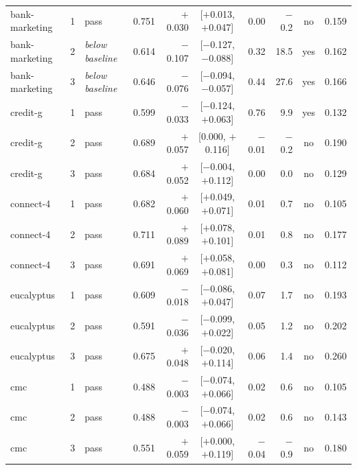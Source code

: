 {\begin{longtable}{lcl rrc rrcr}
\midrule
bank-marketing & 1 & pass & 0.751 & $+$0.030 & [$+$0.013, $+$0.047] & 0.00 & $-$0.2 & no & 0.159 \\
bank-marketing & 2 & \emph{below baseline} & 0.614 & $-$0.107 & [$-$0.127, $-$0.088] & 0.32 & 18.5 & yes & 0.162 \\
bank-marketing & 3 & \emph{below baseline} & 0.646 & $-$0.076 & [$-$0.094, $-$0.057] & 0.44 & 27.6 & yes & 0.166 \\
\midrule
credit-g & 1 & pass & 0.599 & $-$0.033 & [$-$0.124, $+$0.063] & 0.76 & 9.9 & yes & 0.132 \\
credit-g & 2 & pass & 0.689 & $+$0.057 & [0.000, $+$0.116] & $-$0.01 & $-$0.2 & no & 0.190 \\
credit-g & 3 & pass & 0.684 & $+$0.052 & [$-$0.004, $+$0.112] & 0.00 & 0.0 & no & 0.129 \\
\midrule
connect-4 & 1 & pass & 0.682 & $+$0.060 & [$+$0.049, $+$0.071] & 0.01 & 0.7 & no & 0.105 \\
connect-4 & 2 & pass & 0.711 & $+$0.089 & [$+$0.078, $+$0.101] & 0.01 & 0.8 & no & 0.177 \\
connect-4 & 3 & pass & 0.691 & $+$0.069 & [$+$0.058, $+$0.081] & 0.00 & 0.3 & no & 0.112 \\
\midrule
eucalyptus & 1 & pass & 0.609 & $-$0.018 & [$-$0.086, $+$0.047] & 0.07 & 1.7 & no & 0.193 \\
eucalyptus & 2 & pass & 0.591 & $-$0.036 & [$-$0.099, $+$0.022] & 0.05 & 1.2 & no & 0.202 \\
eucalyptus & 3 & pass & 0.675 & $+$0.048 & [$-$0.020, $+$0.114] & 0.06 & 1.4 & no & 0.260 \\
\midrule
cmc & 1 & pass & 0.488 & $-$0.003 & [$-$0.074, $+$0.066] & 0.02 & 0.6 & no & 0.105 \\
cmc & 2 & pass & 0.488 & $-$0.003 & [$-$0.074, $+$0.066] & 0.02 & 0.6 & no & 0.143 \\
cmc & 3 & pass & 0.551 & $+$0.059 & [$+$0.000, $+$0.119] & $-$0.04 & $-$0.9 & no & 0.180 \\
\end{longtable}
}
